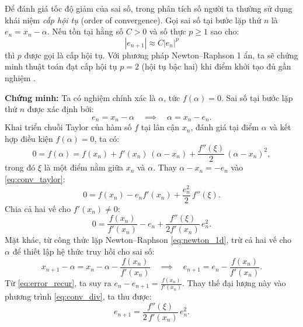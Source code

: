 Để đánh giá tốc độ giảm của sai số, trong phân tích số người ta thường sử dụng khái niệm \textit{cấp hội tụ} (order of convergence). Gọi sai số tại bước lặp thứ $n$ là $e_n = x_n - \alpha$. Nếu tồn tại hằng số $C > 0$ và số thực $p \ge 1$ sao cho:
\begin{equation}
    |e_{n+1}| \approx C |e_n|^p
\end{equation}
thì $p$ được gọi là cấp hội tụ. Với phương pháp Newton–Raphson 1 ẩn, ta sẽ chứng minh thuật toán đạt cấp hội tụ $p = 2$ (hội tụ bậc hai) khi điểm khởi tạo đủ gần nghiệm \cite{chapra_ch6}.

\textbf{Chứng minh:}
Ta có nghiệm chính xác là $\alpha$, tức $f(\alpha) = 0$. Sai số tại bước lặp thứ $n$ được xác định bởi:
\begin{equation}
    e_n = x_n - \alpha \quad \implies \quad \alpha = x_n - e_n.
    \label{eq:error_def}
\end{equation}
Khai triển chuỗi Taylor của hàm số $f$ tại lân cận $x_n$, đánh giá tại điểm $\alpha$ và kết hợp điều kiện $f(\alpha) = 0$, ta có:
\begin{equation}
    0 = f(\alpha) = f(x_n) + f'(x_n)\,(\alpha - x_n) + \frac{f''(\xi)}{2}\,(\alpha - x_n)^2,
    \label{eq:conv_taylor}
\end{equation}
trong đó $\xi$ là một điểm nằm giữa $x_n$ và $\alpha$. Thay $\alpha - x_n = -e_n$ vào \eqref{eq:conv_taylor}:
\begin{equation}
    0 = f(x_n) - e_n f'(x_n) + \frac{e_n^2}{2}\, f''(\xi).
    \label{eq:conv_taylor2}
\end{equation}
Chia cả hai vế cho $f'(x_n) \neq 0$:
\begin{equation}
    0 = \frac{f(x_n)}{f'(x_n)} - e_n + \frac{f''(\xi)}{2f'(x_n)}\, e_n^2.
    \label{eq:conv_div}
\end{equation}
Mặt khác, từ công thức lặp Newton–Raphson \eqref{eq:newton_1d}, trừ cả hai vế cho $\alpha$ để thiết lập hệ thức truy hồi cho sai số:
\begin{equation}
    x_{n+1} - \alpha = x_n - \alpha - \frac{f(x_n)}{f'(x_n)} \quad \implies \quad e_{n+1} = e_n - \frac{f(x_n)}{f'(x_n)}.
    \label{eq:error_recur}
\end{equation}
Từ \eqref{eq:error_recur}, ta suy ra $e_n - e_{n+1} = \frac{f(x_n)}{f'(x_n)}$. Thay thế đại lượng này vào phương trình \eqref{eq:conv_div}, ta thu được:
\begin{equation}
    \boxed{e_{n+1} = \frac{f''(\xi)}{2\,f'(x_n)}\, e_n^2.}
    \label{eq:quadratic_convergence}
\end{equation}

